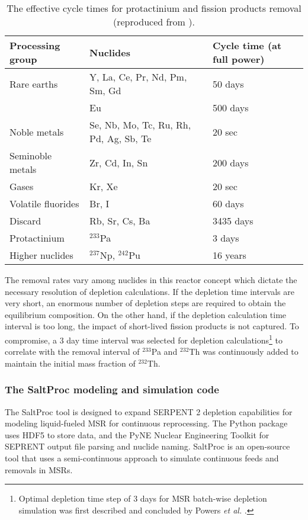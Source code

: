 \begin{table}[ht!]
        \centering
        \caption{The effective cycle times for protactinium and fission 
        products removal (reproduced from \cite{robertson_conceptual_1971}).}
        \begin{tabularx}{\textwidth}{ x | s | x }
        \hline Processing group & \qquad\qquad\qquad Nuclides & Cycle time (at 
                full power) \\ \hline Rare earths & Y, La, Ce, Pr, Nd, Pm, Sm, 
                Gd & 50 days \\ \qquad & Eu & 500 days \\ Noble metals & Se, 
                Nb, Mo, Tc, Ru, Rh, Pd, Ag, Sb, Te & 20 sec \\
        Seminoble metals & Zr, Cd, In, Sn & 200 days \\
        Gases & Kr, Xe & 20 sec \\ Volatile fluorides & Br, I & 60 days \\
        Discard & Rb, Sr, Cs, Ba & 3435 days \\ 
        Protactinium & $^{233}$Pa & 3 days \\ Higher 
                nuclides & $^{237}$Np, $^{242}$Pu & 16 years \\  \hline
        \end{tabularx}
        \label{tab:reprocessing_list}
\end{table}
The removal rates vary among nuclides in this reactor concept which dictate the 
necessary resolution of depletion calculations. If the depletion time intervals 
are very short, an enormous number of depletion steps are required to obtain 
the equilibrium composition. On the other hand, if the depletion  calculation 
time interval is too long, the impact of short-lived fission products is not 
captured. To compromise, a 3 day time interval was selected for depletion 
calculations\footnote{ Optimal depletion time step of 3 days for \gls{MSR} 
batch-wise depletion simulation was first described and concluded by Powers 
\emph{et al.} \cite{powers_new_2013}.} to correlate with the removal interval 
of 
$^{233}$Pa and $^{232}$Th was continuously added to maintain the initial mass 
fraction of $^{232}$Th.

\subsubsection{The SaltProc modeling and simulation code}
The SaltProc tool \cite{rykhlevskii_arfc/saltproc:_2018} is designed to 
expand SERPENT 2
 depletion capabilities for modeling liquid-fueled \gls{MSR} for continuous 
 reprocessing.
The Python package uses HDF5 \cite{the_hdf_group_hierarchical_1997} to store 
data, and the PyNE Nuclear Engineering Toolkit \cite{scopatz_pyne:_2012}
for SEPRENT output file parsing and nuclide naming. SaltProc is an open-source tool 
that uses a semi-continuous approach to simulate continuous feeds and removals 
in \glspl{MSR}. 

